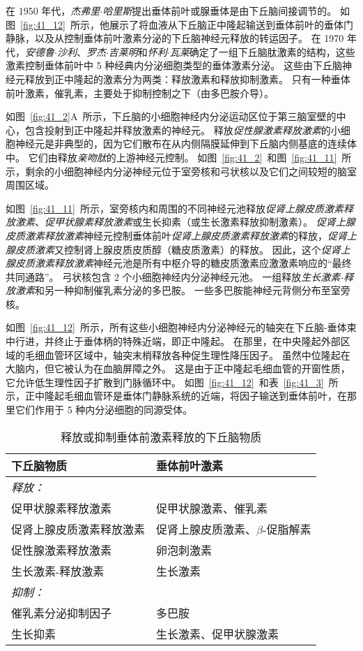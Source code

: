在 1950 年代，\textit{杰弗里$\cdot$哈里斯}提出垂体前叶或腺垂体是由下丘脑间接调节的。
如图~\ref{fig:41_12}~所示，他展示了将血液从下丘脑正中隆起输送到垂体前叶的垂体门静脉，以及从控制垂体前叶激素分泌的下丘脑神经元释放的转运因子。
在 1970 年代，\textit{安德鲁$\cdot$沙利}、\textit{罗杰$\cdot$吉莱明}和\textit{怀利$\cdot$瓦莱}确定了一组下丘脑肽激素的结构，这些激素控制垂体前叶中 5 种经典内分泌细胞类型的垂体激素分泌。
这些由下丘脑神经元释放到正中隆起的激素分为两类：释放激素和释放抑制激素。
只有一种垂体前叶激素，催乳素，主要处于抑制控制之下（由多巴胺介导）。


如图~\ref{fig:41_2}A~所示，下丘脑的小细胞神经内分泌运动区位于第三脑室壁的中心，包含投射到正中隆起并释放激素的神经元。
释放\textit{促性腺激素释放激素}的小细胞神经元是非典型的，因为它们散布在从内侧隔膜延伸到下丘脑内侧基底的连续体中。
它们由释放\textit{亲吻肽}的上游神经元控制。
如图~\ref{fig:41_2}~和图~\ref{fig:41_11}~所示，剩余的小细胞神经内分泌神经元位于室旁核和弓状核以及它们之间较短的脑室周围区域。


如图~\ref{fig:41_11}~所示，室旁核内和周围的不同神经元池释放\textit{促肾上腺皮质激素释放激素}、\textit{促甲状腺素释放激素}或生长抑素（或生长激素释放抑制激素）。
\textit{促肾上腺皮质激素释放激素}神经元控制垂体前叶\textit{促肾上腺皮质激素释放激素}的释放，\textit{促肾上腺皮质激素}又控制肾上腺皮质皮质醇（糖皮质激素）的释放。
因此，这个\textit{促肾上腺皮质激素释放激素}神经元池是所有中枢介导的糖皮质激素应激激素响应的“最终共同通路”。
弓状核包含 2 个小细胞神经内分泌神经元池。
一组释放\textit{生长激素-释放激素}和另一种抑制催乳素分泌的多巴胺。
一些多巴胺能神经元背侧分布至室旁核。


如图~\ref{fig:41_12}~所示，所有这些小细胞神经内分泌神经元的轴突在下丘脑-垂体束中行进，并终止于垂体柄的特殊近端，即正中隆起。
在那里，在中央隆起外部区域的毛细血管环区域中，轴突末梢释放各种促生理性降压因子。
虽然中位隆起在大脑内，但它被认为在血脑屏障之外。
这是由于正中隆起毛细血管的开窗性质，它允许低生理性因子扩散到门脉循环中。
如图~\ref{fig:41_12}~和表~\ref{fig:41_3}~所示，正中隆起毛细血管环是垂体门静脉系统的近端，将因子输送到垂体前叶，在那里它们作用于 5 种内分泌细胞的同源受体。


\begin{table}[htbp]
	\caption{释放或抑制垂体前激素释放的下丘脑物质} \label{tab:41_3} \centering
	\begin{tabular}{ll}
		\toprule
		下丘脑物质 & 垂体前叶激素 \\
		\midrule
		\textit{释放：} &  \\
		促甲状腺素释放激素 & 促甲状腺激素、催乳素  \\
		促肾上腺皮质激素释放激素 & 促肾上腺皮质激素、$\beta$-促脂解素  \\
		促性腺激素释放激素 & 卵泡刺激素  \\
		生长激素-释放激素 & 生长激素  \\
		\textit{抑制：} &  \\
		催乳素分泌抑制因子 & 多巴胺  \\
		生长抑素 & 生长激素、促甲状腺激素  \\
		\bottomrule
	\end{tabular}
\end{table}



